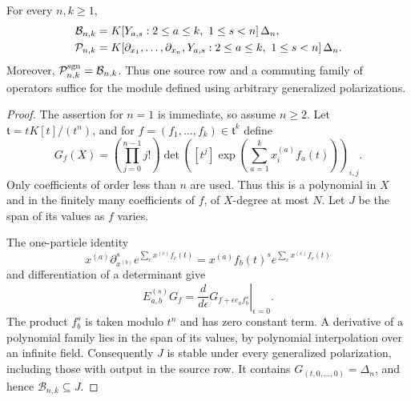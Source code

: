 \begin{theorem}\label{thm:r3-normal-form}
For every $n,k\geq1$,
\begin{align}
 \mathcal B_{n,k}
   &=K[Y_{a,s}:2\leq a\leq k,\ 1\leq s<n]\,\Delta_n,
       \label{eq:r3-pure-normal-form}\\
 \mathcal P_{n,k}
   &=K[\partial_{x_1},\ldots,\partial_{x_n},
           Y_{a,s}:2\leq a\leq k,\ 1\leq s<n]\,\Delta_n.
       \label{eq:r3-full-normal-form}
\end{align}
Moreover, $\mathcal P_{n,k}^{\operatorname{sgn}}=\mathcal B_{n,k}$.
Thus one source row and a commuting family of operators suffice
for the module defined using arbitrary generalized polarizations.
\end{theorem}

\begin{proof}
The assertion for $n=1$ is immediate, so assume $n\geq2$.
Let $\mathfrak t=tK[t]/(t^n)$, and for
$f=(f_1,\ldots,f_k)\in\mathfrak t^k$ define
\begin{equation}\label{eq:r3-jet-determinant}
 G_f(X)=\left(\prod_{j=0}^{n-1}j!\right)
 \det\left([t^j]\exp\left(\sum_{a=1}^k
                              x_i^{(a)}f_a(t)\right)\right)_{i,j}.
\end{equation}
Only coefficients of order less than $n$ are used.  Thus this is a
polynomial in $X$ and in the finitely many coefficients of $f$,
of $X$-degree at most $N$.
Let $J$ be the span of its values as $f$ varies.

The one-particle identity
\[
 x^{(a)}\partial_{x^{(b)}}^s e^{\sum_c x^{(c)}f_c(t)}
      =x^{(a)}f_b(t)^s e^{\sum_c x^{(c)}f_c(t)}
\]
and differentiation of a determinant give
\begin{equation}\label{eq:r3-jet-vector-field}
 E_{a,b}^{(s)}G_f
     =\left.\frac{d}{d\epsilon}
               G_{f+\epsilon e_a f_b^s}\right|_{\epsilon=0}.
\end{equation}
The product $f_b^s$ is taken modulo $t^n$ and has zero constant
term.  A derivative of a polynomial family lies in the span of its
values, by polynomial interpolation over an infinite field.
Consequently $J$ is stable under every generalized polarization,
including those with output in the source row.
It contains $G_{(t,0,\ldots,0)}=\Delta_n$, and hence
$\mathcal B_{n,k}\subseteq J$.


\end{proof}
